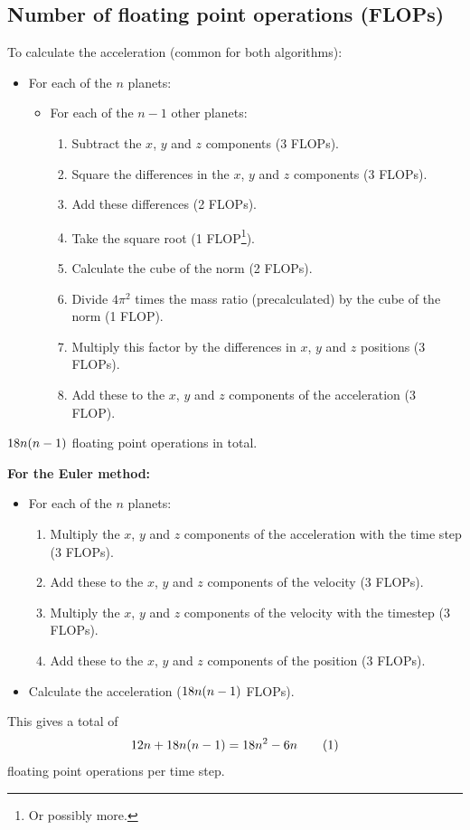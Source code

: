 \documentclass[12pt,english,a4paper]{article}
\newcommand{\eqtag}[1]{\refstepcounter{equation}\tag{\theequation}\label{#1}}
\begin{document}
\subsection{Number of floating point operations (FLOPs)}
\renewcommand{\theenumii}{\arabic{enumii}}
\renewcommand{\theenumiii}{\arabic{enumiii}}
To calculate the acceleration (common for both algorithms):
\begin{itemize}
\item For each of the \(n\) planets:
\begin{itemize}
\item For each of the \(n-1\) other planets:
\begin{enumerate}
\item Subtract the \(x\), \(y\) and \(z\) components (3 FLOPs).
\item Square the differences in the \(x\), \(y\) and \(z\) components (3 FLOPs).
\item Add these differences (2 FLOPs).
\item Take the square root (1 FLOP\footnote{Or possibly more.}).
\item Calculate the cube of the norm (2 FLOPs).
\item Divide \(4\pi^2\) times the mass ratio (precalculated) by the cube of the norm (1 FLOP).\label{factor}
\item Multiply this factor by the differences in \(x\), \(y\) and \(z\) positions (3 FLOPs).
\item Add these to the \(x\), \(y\) and \(z\) components of the acceleration (3 FLOP).
\end{enumerate}
\end{itemize}
\end{itemize}
\(18n\qty(n-1)\) floating point operations in total.

\textbf{For the Euler method:}
\begin{itemize}
\item For each of the \(n\) planets:
\begin{enumerate}
\item Multiply the \(x\), \(y\) and \(z\) components of the acceleration with the time step (3 FLOPs).
\item Add these to the \(x\), \(y\) and \(z\) components of the velocity (3 FLOPs).
\item Multiply the \(x\), \(y\) and \(z\) components of the velocity with the timestep (3 FLOPs).
\item Add these to the \(x\), \(y\) and \(z\) components of the position (3 FLOPs).
\end{enumerate}
\item Calculate the acceleration (\(18n\qty(n-1)\) FLOPs).
\end{itemize}
This gives a total of \[12n + 18n\qty(n-1) = 18n^2-6n\eqtag{eulerflops}\] floating point operations per time step.
\end{document}
